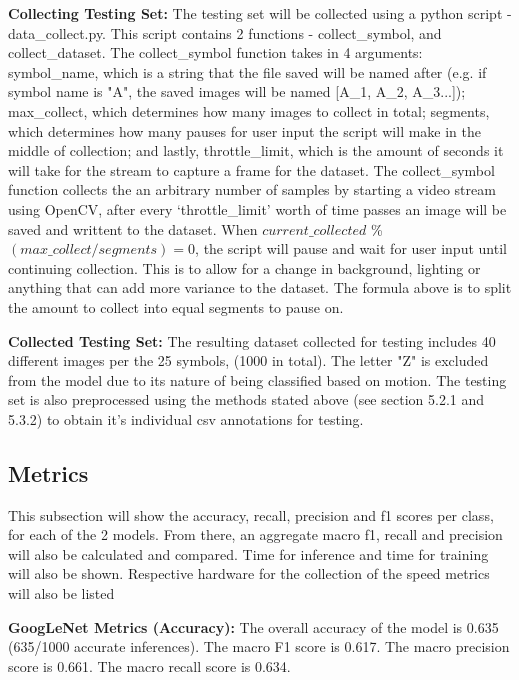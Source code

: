 \documentclass[11pt]{article}
\def\paraskip{\vskip 0.4cm}
\begin{document}
        \noindent\textbf{Collecting Testing Set: } The testing set will be collected using a python script - data\_collect.py. This script contains 2 functions - collect\_symbol, and collect\_dataset. The collect\_symbol function takes in 4 arguments: symbol\_name, which is a string that the file saved will be named after (e.g. if symbol name is "A", the saved images will be named [A\_1, A\_2, A\_3...]); max\_collect, which determines how many images to collect in total; segments, which determines how many pauses for user input the script will make in the middle of collection; and lastly, throttle\_limit, which is the amount of seconds it will take for the stream to capture a frame for the dataset. The collect\_symbol function collects the an arbitrary number of samples by starting a video stream using OpenCV, after every `throttle\_limit' worth of time passes an image will be saved and writtent to the dataset. When $current\_collected$ \% $ (max\_collect/segments) = 0$, the script will pause and wait for user input until continuing collection. This is to allow for a change in background, lighting or anything that can add more variance to the dataset. The formula above is to split the amount to collect into equal segments to pause on.
        
        \paraskip

        \noindent\textbf{Collected Testing Set: } The resulting dataset collected for testing includes 40 different images per the 25 symbols, (1000 in total). The letter "Z" is excluded from the model due to its nature of being classified based on motion. The testing set is also preprocessed using the methods stated above (see section 5.2.1 and 5.3.2) to obtain it's individual csv annotations for testing.

    \subsection{Metrics}
        This subsection will show the accuracy, recall, precision and f1 scores per class, for each of the 2 models. From there, an aggregate macro f1, recall and precision will also be calculated and compared. Time for inference and time for training will also be shown. Respective hardware for the collection of the speed metrics will also be listed

        \paraskip

        \noindent\textbf{GoogLeNet Metrics (Accuracy): } 
        The overall accuracy of the model is 0.635 (635/1000 accurate inferences). The macro F1 score is 0.617. The macro precision score is 0.661. The macro recall score is 0.634.
\end{document}
